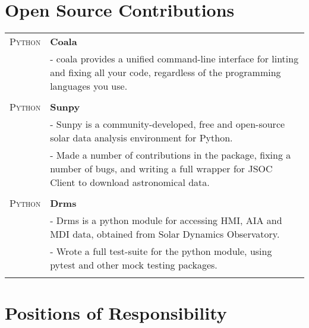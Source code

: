 \documentclass[a4paper,10pt]{extarticle} %
\begin{document}

\section{Open Source Contributions}

\begin{tabular}{r|p{18cm}}

\textsc{Python} & \textbf{Coala}
\vspace{1mm} \\
& \footnotesize{- coala provides a unified command-line interface for linting and fixing all your code, regardless of the programming languages you use.}\\
\multicolumn{2}{c}{} \\

\textsc{Python} & \textbf{Sunpy}
\vspace{1mm} \\
& \footnotesize{- Sunpy is a community-developed, free and open-source solar data analysis environment for Python.}\\
& \footnotesize{- Made a number of contributions in the package, fixing a number of bugs, and writing a full wrapper for JSOC Client to download astronomical data.}\\
\multicolumn{2}{c}{} \\

\textsc{Python} & \textbf{Drms}
\vspace{1mm} \\
& \footnotesize{- Drms is a python module for accessing HMI, AIA and MDI data, obtained from Solar Dynamics Observatory.}\\
& \footnotesize{- Wrote a full test-suite for the python module, using pytest and other mock testing packages.}\\
\multicolumn{2}{c}{} \\

\end{tabular}



\section{Positions of Responsibility}
\end{document}
